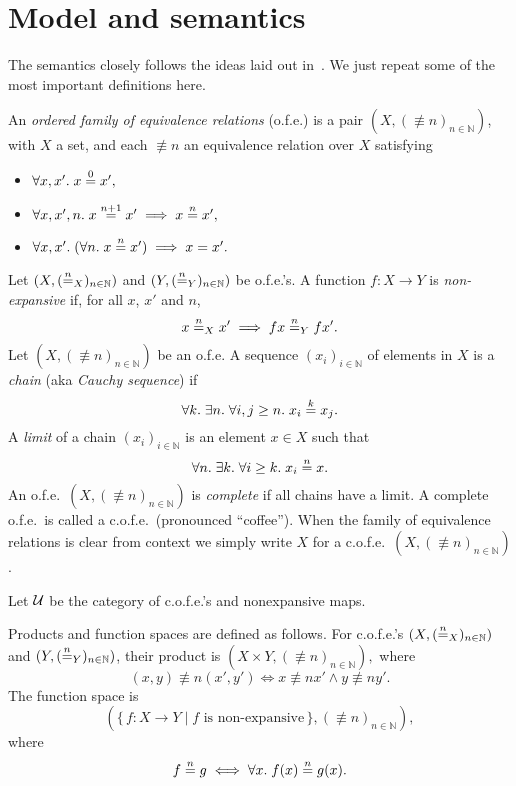 \section{Model and semantics}

The semantics closely follows the ideas laid out in~\cite{catlogic}.
We just repeat some of the most important definitions here.

An \emph{ordered family of equivalence relations} (o.f.e.\@) is a pair
$(X,(\nequiv{n})_{n\in\mathbb{N}})$, with $X$ a set, and each $\nequiv{n}$ 
an equivalence relation over $X$ satisfying
\begin{itemize}
	\item $\All x,x'. x \nequiv{0} x',$
	\item $\All x,x',n. x \nequiv{n+1} x' \implies x \nequiv{n} x',$
	\item $\All x,x'. (\All n. x\nequiv{n} x') \implies x = x'.$
\end{itemize}

Let $(X,(\mathrel{\stackrel{n}{=}_{X}})_{n\in\mathbb{N}})$ and
$(Y,(\mathrel{\stackrel{n}{=}_{Y}})_{n\in\mathbb{N}})$ be o.f.e.'s. A function $f:
X\to Y$ is \emph{non-expansive} if,   for all $x$, $x'$ and $n$,
\[
x \mathrel{\stackrel{n}{=}_{X}} x' \implies 
fx \mathrel{\stackrel{n}{=}_{Y}} f x'.
\]
Let $(X,(\nequiv{n})_{n\in\mathbb{N}})$ be an o.f.e.
A sequence $(x_i)_{i\in\mathbb{N}}$ of elements in $X$ is a
\emph{chain} (aka \emph{Cauchy sequence}) if
\[
\All k. \Exists n. \All i,j\geq n. x_i \nequiv{k} x_j.
\]
A \emph{limit} of a chain $(x_i)_{i\in\mathbb{N}}$ is an element
$x\in X$ such that
\[
\All n. \Exists k. \All i\geq k. x_i \nequiv{n} x.
\]
An o.f.e.\ $(X,(\nequiv{n})_{n\in\mathbb{N}})$ is \emph{complete} 
if all chains have a limit.
A complete o.f.e.\ is called a c.o.f.e.\ (pronounced ``coffee'').
When the family of equivalence relations is clear from context we
simply
write $X$ for a c.o.f.e.\ $(X,(\nequiv{n})_{n\in\mathbb{N}})$.


Let $\cal U$ be the category of c.o.f.e.'s and nonexpansive maps.

Products and function spaces are defined as follows.
For c.o.f.e.'s $(X,(\mathrel{\stackrel{n}{=}_{X}})_{n\in\mathbb{N}})$ and
$(Y,(\mathrel{\stackrel{n}{=}_{Y}})_{n\in\mathbb{N}})$, their product 
is 
$(X\times Y, (\nequiv{n})_{n\in\mathbb{N}}),$
where
\[
(x,y) \nequiv{n} (x',y') \iff
x \nequiv{n} x' \land
y \nequiv{n} y'.
\]
The function space is
\[
(\{\, f : X\to Y \mid f \text{ is non-expansive}\,\}, (\nequiv{n})_{n\in\mathbb{N}}),
\]
where
\[
f \nequiv{n} g \iff
\All x. f(x)  \nequiv{n}  g(x).
\]

